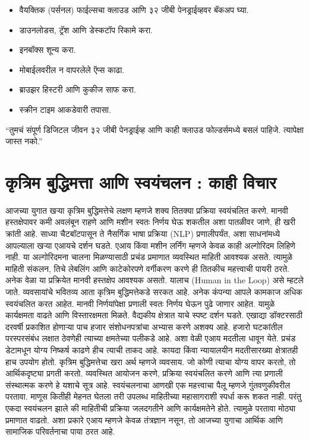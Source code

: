 \begin{itemize}
\item  वैयक्तिक (पर्सनल) फाईल्सचा क्लाउड आणि ३२ जीबी  पेनड्राईव्हवर बॅकअप घ्या.
\item  डाउनलोडस, ट्रॅश  आणि डेस्कटॉप रिकामे करा.
\item इनबॉक्स शून्य करा.
\item मोबाईलवरील न वापरलेले ऍप्स काढा.
\item ब्राउझर हिस्टरी आणि कुकीज साफ करा.
\item स्क्रीन टाइम आकडेवारी तपासा.
\end{itemize}


“तुमचं संपूर्ण डिजिटल जीवन ३२ जीबी  पेनड्राईव्ह आणि काही क्लाउड फोल्डर्समध्ये बसलं पाहिजे. त्यापेक्षा जास्त नको.”

\chapter{कृत्रिम बुद्धिमत्ता आणि स्वयंचलन : काही विचार}
आजच्या युगात खऱ्या कृत्रिम बुद्धिमत्तेचे लक्षण म्हणजे शक्य तितक्या प्रक्रिया स्वयंचलित करणे. मानवी हस्तक्षेपावर कमी अवलंबून राहणे आणि मशीन स्वतः निर्णय घेऊ शकतील अशा पातळीवर जाणे, ही खरी क्रांती आहे. साध्या चैटबॉटपासून ते नैसर्गिक भाषा प्रक्रिया (NLP) प्रणालीपर्यंत, अशा साधनांमध्ये आपल्याला खऱ्या एआयचे दर्शन घडते.
एआय किंवा मशीन लर्निंग म्हणजे केवळ काही अल्गोरिदम लिहिणे नाही. या अल्गोरिदमना चालना मिळण्यासाठी प्रचंड प्रमाणात व्यवस्थित माहिती आवश्यक असते. त्यामुळे माहिती संकलन, तिचे लेबलिंग आणि काटेकोरपणे वर्गीकरण करणे ही तितकीच महत्त्वाची पायरी ठरते. अनेक वेळा या प्रक्रियेत मानवी हस्तक्षेप आवश्यक असतो. यालाच (Human in the Loop) असे म्हटले जाते.
व्यवसायांचे भवितव्य आता कृत्रिम बुद्धिमत्तेकडे सरकत आहे. अनेक कंपन्या आपले कामकाज अधिक स्वयंचलित करत आहेत. मानवी निर्णयांपेक्षा प्रणाली स्वतः निर्णय घेऊन पुढे जाणार आहेत. यामुळे कार्यक्षमता वाढते आणि विस्तारक्षमता मिळते.
वैद्यकीय क्षेत्रात याचे स्पष्ट दर्शन घडते. एखाद्या डॉक्टरसाठी दरवर्षी प्रकाशित होणाऱ्या पाच हजार संशोधनपत्रांचा अभ्यास करणे अशक्य आहे. हजारो घटकांतील परस्परसंबंध लक्षात ठेवणेही त्याच्या क्षमतेच्या पलीकडे आहे. अशा वेळी एआय मदतीला धावून येते. प्रचंड डेटामधून योग्य निष्कर्ष काढणे हीच त्याची ताकद आहे. कायदा किंवा न्यायालयीन मदतीसारख्या क्षेत्रातही हाच उपयोग होतो.
कृत्रिम बुद्धिमत्तेचा खरा अर्थ म्हणजे व्यवसाय. जो कोणी त्याचा योग्य वापर करतो, तो आर्थिकदृष्ट्या प्रगती करतो. व्यवस्थित आयोजन करणे, प्रक्रिया स्वयंचलित करणे आणि त्या प्रणाली संस्थात्मक करणे हे यशाचे सूत्र आहे.
स्वयंचलनाचा आणखी एक महत्त्वाचा पैलू म्हणजे गुंतवणुकीवरील परतावा. माणूस कितीही मेहनत घेतला तरी उपलब्ध माहितीच्या महासागराशी स्पर्धा करू शकत नाही. परंतु एकदा स्वयंचलन झाले की माहितीची प्रक्रिया जलदगतीने आणि कार्यक्षमतेने होते. त्यामुळे परतावा मोठ्या प्रमाणात वाढतो.
अशा प्रकारे एआय म्हणजे केवळ तंत्रज्ञान नसून, तो आजच्या युगाचा आर्थिक आणि सामाजिक परिवर्तनाचा पाया ठरत आहे.

